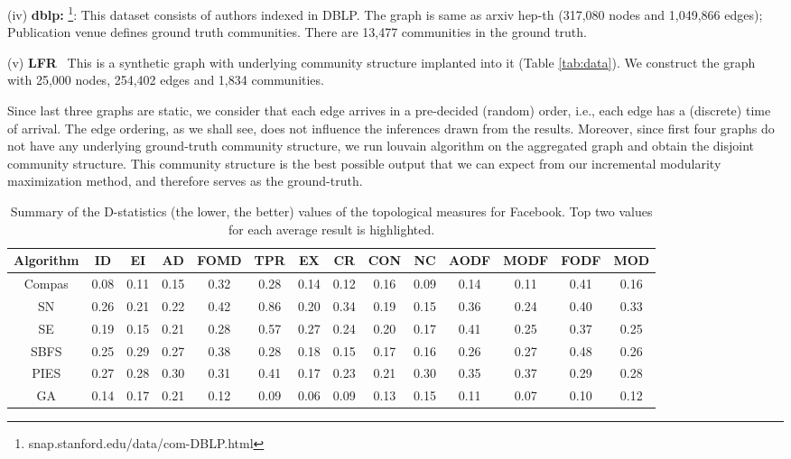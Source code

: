 (iv) {\bf dblp:} 
\footnote{snap.stanford.edu/data/com-DBLP.html}:
This dataset consists of authors indexed in DBLP. The graph is same as arxiv hep-th (317,080 nodes and 1,049,866 edges);
Publication venue defines ground truth communities. There are 13,477 communities in the ground truth.

(v) {\bf LFR}~\cite{lancichinetti2008benchmark} This is a synthetic graph with underlying community structure implanted into it (Table \ref{tab:data}).
We construct the graph with 25,000 nodes, 254,402 edges and 1,834 communities.

Since last three graphs are static, we consider that each edge arrives in a pre-decided (random) order, i.e., each edge has a (discrete) time of arrival. 
The edge ordering, as we shall see, does not influence the inferences drawn from the results.
Moreover, since first four graphs do not have any underlying ground-truth community structure, we run louvain algorithm %
on the aggregated graph and obtain the disjoint community structure. This community structure is the best possible output that we can expect from our incremental modularity maximization method, and therefore serves as the ground-truth. 


\begin{table}
\centering
\caption{Summary of the D-statistics (the lower, the better) values of the topological measures for Facebook. Top two values for each average result is highlighted.}
\label{tab_fb}
\begin{adjustbox}{max width=\textwidth}
\begin{tabular}{c|c c c c c c c c c c c c c }
\hline
Algorithm & ID & EI & AD & FOMD & TPR & EX & CR & CON & NC & AODF & MODF & FODF & MOD \\ \hline
Compas    & 0.08   & 0.11   & 0.15   & 0.32     & 0.28    & 0.14   & 0.12   & 0.16    & 0.09   & 0.14     & 0.11     & 0.41     & 0.16    \\ 
SN        & 0.26   & 0.21   & 0.22   & 0.42     & 0.86    & 0.20   & 0.34   & 0.19    & 0.15   &  0.36    & 0.24     & 0.40     & 0.33    \\ 
SE        & 0.19   & 0.15   & 0.21   & 0.28     & 0.57    & 0.27   & 0.24   & 0.20    & 0.17   & 0.41     & 0.25     & 0.37     & 0.25    \\ 
SBFS      &  0.25  & 0.29   & 0.27   & 0.38     & 0.28    & 0.18   & 0.15   & 0.17    & 0.16   & 0.26     & 0.27     & 0.48     &  0.26   \\ 
PIES      & 0.27   &  0.28  & 0.30   & 0.31     & 0.41    & 0.17   &  0.23  &  0.21   &  0.30  & 0.35     & 0.37     &  0.29    & 0.28    \\ 
GA        & 0.14    &  0.17   &  0.21   & 0.12     &  0.09   &  0.06  & 0.09   &  0.13    & 0.15   & 0.11     &  0.07      & 0.10   & 0.12 \\ \hline
\end{tabular}
\end{adjustbox}
\vspace{3mm}
\end{table}


